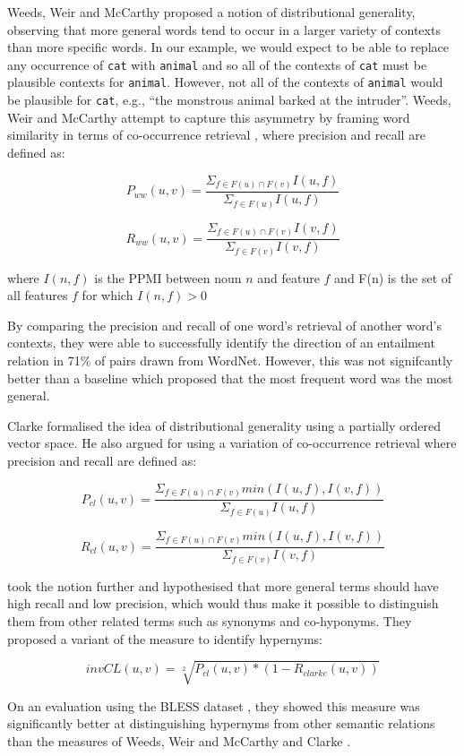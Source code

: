 \documentclass[11pt]{article}
\begin{document}
Weeds, Weir and McCarthy  proposed a notion of distributional generality, observing that more general words tend to occur in a larger variety of contexts than more specific words.  In our example, we would expect to be able to replace any occurrence of \texttt{cat} with \texttt{animal} and so all of the contexts of \texttt{cat} must be plausible contexts for \texttt{animal}.  However, not all of the contexts of \texttt{animal} would be plausible for \texttt{cat}, e.g., ``the monstrous animal barked at the intruder''.  Weeds, Weir and McCarthy attempt to capture this asymmetry by framing word similarity in terms of co-occurrence retrieval \cite{Weeds2003}, where precision and recall are defined as:

\[
P_{ww}(u,v) = \frac{\Sigma_{f \in F(u) \cap F(v)} I(u,f)}{\Sigma_{f \in F(u)} I(u,f)}
\]

\[
R_{ww}(u,v) = \frac{\Sigma_{f \in F(u) \cap F(v)} I(v,f)}{\Sigma_{f \in F(v)} I(v,f)}
\]

where $I(n,f)$ is the PPMI between noun $n$ and feature $f$ and F(n) is the set of all features $f$ for which $I(n,f)>0$

By comparing the precision and recall of one word's retrieval of another word's contexts, they were able to successfully identify the direction of an entailment relation in 71\% of pairs drawn from WordNet.  However, this was not signifcantly better than a baseline which proposed that the most frequent word was the most general.

Clarke  formalised the idea of distributional generality using a partially ordered vector space.  He also argued for using a variation of co-occurrence retrieval where precision and recall are defined as:

\[
P_{cl}(u,v) = \frac{\Sigma_{f \in F(u) \cap F(v)} min(I(u,f),I(v,f))}{\Sigma_{f \in F(u)} I(u,f)}
\]

\[
R_{cl}(u,v) = \frac{\Sigma_{f \in F(u) \cap F(v)} min(I(u,f),I(v,f))}{\Sigma_{f \in F(v)} I(v,f)}
\]

 took the notion further and hypothesised that more general terms should have high recall and low precision, which would thus make it possible to distinguish them from other related terms such as synonyms and co-hyponyms.  They proposed a variant of the  measure to identify hypernyms:

\[
invCL(u,v) = \sqrt[2]{P_{cl}(u,v)*(1-R_{clarke}(u,v))}
\]

On an evaluation using the BLESS dataset \cite{Baroni2011}, they showed this measure was significantly better at distinguishing hypernyms from other semantic relations than the measures of Weeds, Weir and McCarthy  and Clarke .
\end{document}

